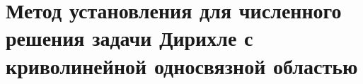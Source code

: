 \documentclass[__main__.tex]{subfiles}
\begin{document}
\section{Метод установления для численного решения задачи Дирихле с криволинейной односвязной областью}
\end{document}
